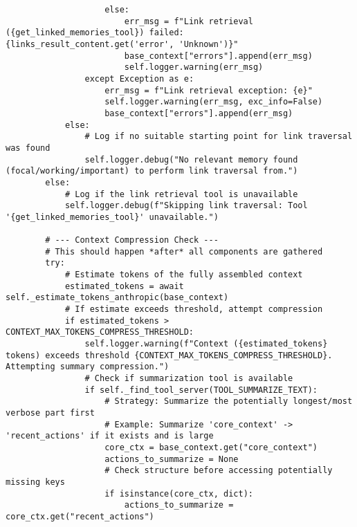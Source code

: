 \documentclass[12pt,a4paper]{article}
\begin{document}
\begin{pageablecode}
\begin{verbatim}
                    else:
                        err_msg = f"Link retrieval ({get_linked_memories_tool}) failed: {links_result_content.get('error', 'Unknown')}"
                        base_context["errors"].append(err_msg)
                        self.logger.warning(err_msg)
                except Exception as e:
                    err_msg = f"Link retrieval exception: {e}"
                    self.logger.warning(err_msg, exc_info=False)
                    base_context["errors"].append(err_msg)
            else:
                # Log if no suitable starting point for link traversal was found
                self.logger.debug("No relevant memory found (focal/working/important) to perform link traversal from.")
        else:
            # Log if the link retrieval tool is unavailable
            self.logger.debug(f"Skipping link traversal: Tool '{get_linked_memories_tool}' unavailable.")

        # --- Context Compression Check ---
        # This should happen *after* all components are gathered
        try:
            # Estimate tokens of the fully assembled context
            estimated_tokens = await self._estimate_tokens_anthropic(base_context)
            # If estimate exceeds threshold, attempt compression
            if estimated_tokens > CONTEXT_MAX_TOKENS_COMPRESS_THRESHOLD:
                self.logger.warning(f"Context ({estimated_tokens} tokens) exceeds threshold {CONTEXT_MAX_TOKENS_COMPRESS_THRESHOLD}. Attempting summary compression.")
                # Check if summarization tool is available
                if self._find_tool_server(TOOL_SUMMARIZE_TEXT):
                    # Strategy: Summarize the potentially longest/most verbose part first
                    # Example: Summarize 'core_context' -> 'recent_actions' if it exists and is large
                    core_ctx = base_context.get("core_context")
                    actions_to_summarize = None
                    # Check structure before accessing potentially missing keys
                    if isinstance(core_ctx, dict):
                        actions_to_summarize = core_ctx.get("recent_actions")


\end{verbatim}
\end{pageablecode}
\end{document}
